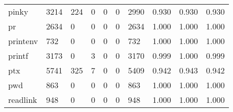 \begin{longtable}{lp{2.0cm}p{2.0cm}p{2.0cm}p{2.0cm}p{2.0cm}p{2.0cm}p{2.0cm}p{2.0cm}p{2.0cm}}
pinky     &                   3214 &                                224 &                                 0 &                                0 &                                 0 &                            2990 &                                0.930 &                                  0.930 &                                0.930 \\
pr        &                   2634 &                                  0 &                                 0 &                                0 &                                 0 &                            2634 &                                1.000 &                                  1.000 &                                1.000 \\
printenv  &                    732 &                                  0 &                                 0 &                                0 &                                 0 &                             732 &                                1.000 &                                  1.000 &                                1.000 \\
printf    &                   3173 &                                  0 &                                 3 &                                0 &                                 0 &                            3170 &                                0.999 &                                  1.000 &                                0.999 \\
ptx       &                   5741 &                                325 &                                 7 &                                0 &                                 0 &                            5409 &                                0.942 &                                  0.943 &                                0.942 \\
pwd       &                    863 &                                  0 &                                 0 &                                0 &                                 0 &                             863 &                                1.000 &                                  1.000 &                                1.000 \\
readlink  &                    948 &                                  0 &                                 0 &                                0 &                                 0 &                             948 &                                1.000 &                                  1.000 &                                1.000 \\

\end{longtable}
